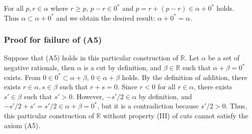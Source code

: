 \documentclass{scrartcl}
\begin{document}
For all \(p, r \in \alpha\) where \(r \geq p\), \(p - r \in 0^*\) and \(p = r + (p - r) \in \alpha + 0^*\) holds.
Thus \(\alpha \subset \alpha + 0^*\) and we obtain the desired result: \(\alpha + 0^* = \alpha\).

\subsubsection{Proof for failure of (A5)}
Suppose that (A5) holds in this particular construction of \(\mathbb{R}\).
Let \(\alpha\) be a set of negative rationals, then \(\alpha\) is a cut by definition, and \(\beta \in \mathbb{R}\) such that \(\alpha + \beta = 0^*\) exists.
From \(0 \in 0^* \subset \alpha + \beta\), \(0 \in \alpha + \beta\) holds.
By the definition of addition, there exists \(r \in \alpha, s \in \beta\) such that \(r + s = 0\).
Since \(r < 0\) for all \(r \in \alpha\), there exists \(s' \in \beta\) such that \(s' > 0\).
However, \(-s' / 2 \in \alpha\) by definition, and \(-s' / 2 + s' = s' / 2 \in \alpha + \beta = 0^*\), but it is a contradiction because \(s' / 2 > 0\).
Thus, this particular construction of \(\mathbb{R}\) without property (III) of cuts cannot satisfy the axiom (A5).
\end{document}
